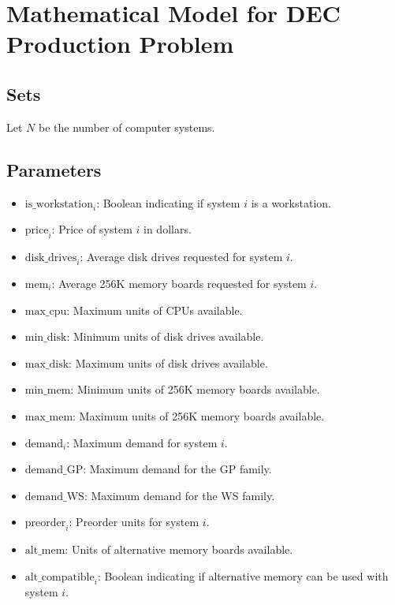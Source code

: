 \documentclass{article}
\begin{document}
\section*{Mathematical Model for DEC Production Problem}

\subsection*{Sets}
Let \( N \) be the number of computer systems.

\subsection*{Parameters}
\begin{itemize}
    \item \( \text{is\_workstation}_i \): Boolean indicating if system \( i \) is a workstation.
    \item \( \text{price}_i \): Price of system \( i \) in dollars.
    \item \( \text{disk\_drives}_i \): Average disk drives requested for system \( i \).
    \item \( \text{mem}_i \): Average 256K memory boards requested for system \( i \).
    \item \( \text{max\_cpu} \): Maximum units of CPUs available.
    \item \( \text{min\_disk} \): Minimum units of disk drives available.
    \item \( \text{max\_disk} \): Maximum units of disk drives available.
    \item \( \text{min\_mem} \): Minimum units of 256K memory boards available.
    \item \( \text{max\_mem} \): Maximum units of 256K memory boards available.
    \item \( \text{demand}_i \): Maximum demand for system \( i \).
    \item \( \text{demand\_GP} \): Maximum demand for the GP family.
    \item \( \text{demand\_WS} \): Maximum demand for the WS family.
    \item \( \text{preorder}_i \): Preorder units for system \( i \).
    \item \( \text{alt\_mem} \): Units of alternative memory boards available.
    \item \( \text{alt\_compatible}_i \): Boolean indicating if alternative memory can be used with system \( i \).
\end{itemize}
\end{document}
